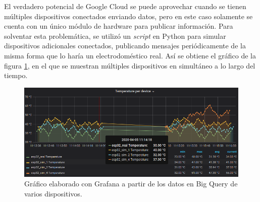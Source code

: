 El verdadero potencial de Google Cloud se puede aprovechar cuando se tienen múltiples dispositivos conectados enviando datos, pero en este caso solamente se cuenta con un único módulo de hardware para publicar información. Para solventar esta problemática, se utilizó un \emph{script} en Python para simular dispositivos adicionales conectados, publicando mensajes periódicamente de la misma forma que lo haría un electrodoméstico real. Así se obtiene el gráfico de la figura \ref{fig:gcloud_grafana_multiple}, en el que se muestran múltiples dispositivos en simultáneo a lo largo del tiempo.

\begin{figure}[h]
\centering
\includegraphics[width=\textwidth]{./Figures/gcloud_grafana_multiple.png}
\caption{Gráfico elaborado con Grafana a partir de los datos en Big Query de varios dispositivos.}
\label{fig:gcloud_grafana_multiple}
\end{figure}



